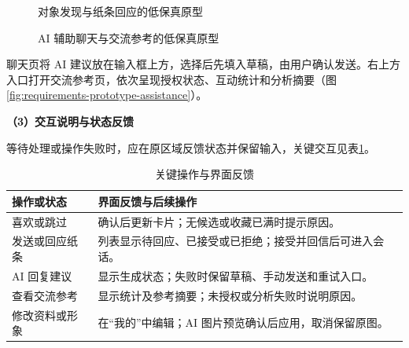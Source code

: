 \begin{figure}[H]
\centering
\resizebox{0.96\linewidth}{!}{}
\caption{对象发现与纸条回应的低保真原型}
\label{fig:requirements-prototype-entry}
\label{fig:requirements-meet}
\label{fig:requirements-notes}
\end{figure}


\begin{figure}[H]
\centering
\resizebox{0.96\linewidth}{!}{}
\caption{AI 辅助聊天与交流参考的低保真原型}
\label{fig:requirements-prototype-assistance}
\label{fig:requirements-chat}
\end{figure}

聊天页将 AI 建议放在输入框上方，选择后先填入草稿，由用户确认发送。右上方入口打开交流参考页，依次呈现授权状态、互动统计和分析摘要（图\ref{fig:requirements-prototype-assistance}）。

\noindent\textbf{（3）交互说明与状态反馈}

等待处理或操作失败时，应在原区域反馈状态并保留输入，关键交互见表\ref{tab:requirements-ui-states}。

\begin{table}[H]
\centering
\small
\caption{关键操作与界面反馈}
\label{tab:requirements-ui-states}
\begin{tabularx}{\linewidth}{@{}>{\raggedright\arraybackslash}p{30mm}>{\raggedright\arraybackslash}X@{}}
\toprule
操作或状态 & 界面反馈与后续操作 \\
\midrule
喜欢或跳过 & 确认后更新卡片；无候选或收藏已满时提示原因。 \\
发送或回应纸条 & 列表显示待回应、已接受或已拒绝；接受并回信后可进入会话。 \\
AI 回复建议 & 显示生成状态；失败时保留草稿、手动发送和重试入口。 \\
查看交流参考 & 显示统计及参考摘要；未授权或分析失败时说明原因。 \\
修改资料或形象 & 在“我的”中编辑；AI 图片预览确认后应用，取消保留原图。 \\
\bottomrule
\end{tabularx}
\end{table}

\endgroup
